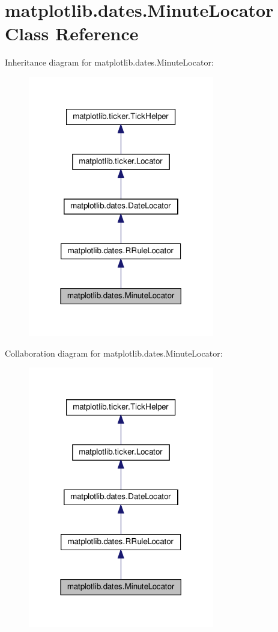 \hypertarget{classmatplotlib_1_1dates_1_1MinuteLocator}{}\section{matplotlib.\+dates.\+Minute\+Locator Class Reference}
\label{classmatplotlib_1_1dates_1_1MinuteLocator}


Inheritance diagram for matplotlib.\+dates.\+Minute\+Locator\+:
\nopagebreak
\begin{figure}[H]
\begin{center}
\leavevmode
\includegraphics[width=230pt]{classmatplotlib_1_1dates_1_1MinuteLocator__inherit__graph}
\end{center}
\end{figure}


Collaboration diagram for matplotlib.\+dates.\+Minute\+Locator\+:
\nopagebreak
\begin{figure}[H]
\begin{center}
\leavevmode
\includegraphics[width=230pt]{classmatplotlib_1_1dates_1_1MinuteLocator__coll__graph}
\end{center}
\end{figure}
